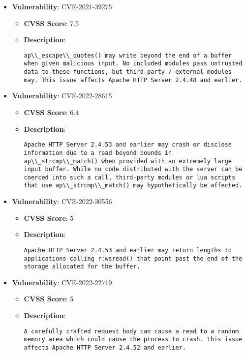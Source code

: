 \documentclass{article}
\begin{document}
\begin{itemize}
        \item \textbf{Vulnerability}: CVE-2021-39275
        \begin{itemize}
            \item \textbf{CVSS Score}:  7.5 
            \item \textbf{Description}:
            \parbox[t]{0.9\linewidth}{
                \verb|ap\\_escape\\_quotes() may write beyond the end of a buffer when given malicious input. No included modules pass untrusted data to these functions, but third-party / external modules may. This issue affects Apache HTTP Server 2.4.48 and earlier.|
            }
        \end{itemize}
    
        \item \textbf{Vulnerability}: CVE-2022-28615
        \begin{itemize}
            \item \textbf{CVSS Score}:  6.4 
            \item \textbf{Description}:
            \parbox[t]{0.9\linewidth}{
                \verb|Apache HTTP Server 2.4.53 and earlier may crash or disclose information due to a read beyond bounds in ap\\_strcmp\\_match() when provided with an extremely large input buffer. While no code distributed with the server can be coerced into such a call, third-party modules or lua scripts that use ap\\_strcmp\\_match() may hypothetically be affected.|
            }
        \end{itemize}
    
        \item \textbf{Vulnerability}: CVE-2022-30556
        \begin{itemize}
            \item \textbf{CVSS Score}:  5 
            \item \textbf{Description}:
            \parbox[t]{0.9\linewidth}{
                \verb|Apache HTTP Server 2.4.53 and earlier may return lengths to applications calling r:wsread() that point past the end of the storage allocated for the buffer.|
            }
        \end{itemize}
    
        \item \textbf{Vulnerability}: CVE-2022-22719
        \begin{itemize}
            \item \textbf{CVSS Score}:  5 
            \item \textbf{Description}:
            \parbox[t]{0.9\linewidth}{
                \verb|A carefully crafted request body can cause a read to a random memory area which could cause the process to crash. This issue affects Apache HTTP Server 2.4.52 and earlier.|
            }
        \end{itemize}
    

\end{itemize}
\end{document}
